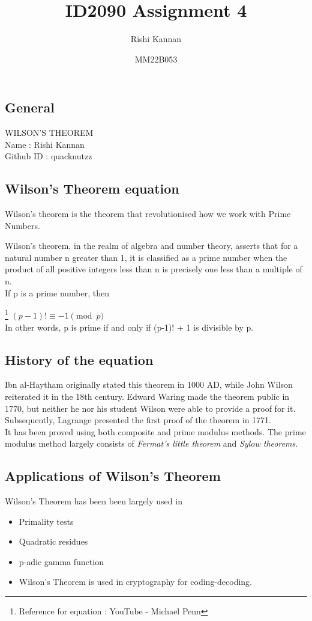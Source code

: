 \documentclass{article}
\title{ID2090 Assignment 4}
\author{Rishi Kannan }
\date{MM22B053}
\begin{document}
\maketitle

\section{}
\subsection{General}
\large WILSON'S THEOREM\\
Name : Rishi Kannan\\
Github ID : quacknutzz\\


\subsection{Wilson's Theorem equation}

\large Wilson's theorem is the theorem that revolutionised how we work with Prime Numbers. 

Wilson's theorem, in the realm of algebra and number theory, asserts that for a natural number n greater than 1, it is classified as a prime number when the product of all positive integers less than n is precisely one less than a multiple of n.\\
If p is a prime number, then

\footnote{Reference for equation : YouTube - Michael Penn}
\Large$(p-1)! \equiv -1\pmod{p}$\\ 
\large In other words, p is prime if and only if (p-1)! + 1 is divisible by p. 

\subsection{History of the equation}

\large Ibn al-Haytham originally stated this theorem in 1000 AD, while John Wilson reiterated it in the 18th century. Edward Waring made the theorem public in 1770, but neither he nor his student Wilson were able to provide a proof for it. Subsequently, Lagrange presented the first proof of the theorem in 1771.\\
It has been proved using both composite and prime modulus methods. The prime modulus method largely consists of \textit{Fermat's little theorem} and \textit{Sylow theorems}.

\subsection{Applications of Wilson's Theorem}

\large Wilson's Theorem has been been largely used in 
\begin{itemize}
  \item Primality tests
  \item Quadratic residues
  \item p-adic gamma function
  \item Wilson's Theorem is used in cryptography for coding-decoding.
\end{itemize}
\end{document}
